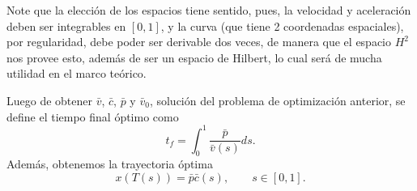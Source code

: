 \documentclass[a4paper,10pt]{book}
\newcommand{\R}{\mathbbm{R}}
\begin{document}
Note que la elección de los espacios tiene sentido, pues, la velocidad y aceleración deben ser integrables en $[0,1]$, y la curva (que tiene 2 coordenadas espaciales), por regularidad, debe poder ser derivable dos veces, de manera que el espacio $H^2$ nos provee esto, además de ser un espacio de Hilbert, lo cual será de mucha utilidad en el marco teórico.


Luego de obtener $\bar v$, $\bar c$, $\bar p$ y $\bar v_0$, solución del problema de optimización anterior, se define el tiempo final óptimo como
\[
 t_f=\int_{0}^{1} \frac{\bar p}{\bar v(s)}ds.
\]
Además, obtenemos la trayectoria óptima
\[
 x(T(s))=\bar p\bar c(s),\qquad s\in[0,1].
\]

% 
% 
% 
% 
% 
\end{document}
